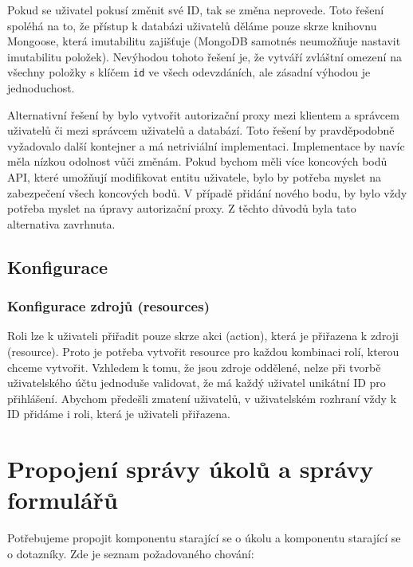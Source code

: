 Pokud se uživatel pokusí změnit své ID, tak se změna neprovede.
Toto řešení spoléhá na to, že přístup k databázi uživatelů děláme pouze skrze knihovnu Mongoose, která imutabilitu zajišťuje (MongoDB samotnés neumožňuje nastavit imutabilitu položek).
Nevýhodou tohoto řešení je, že vytváří zvláštní omezení na všechny položky s klíčem \texttt{id} ve všech odevzdáních, ale zásadní výhodou je jednoduchost.

Alternativní řešení by bylo vytvořit autorizační proxy mezi klientem a správcem uživatelů či mezi správcem uživatelů a databází.
Toto řešení by pravděpodobně vyžadovalo další kontejner a má netriviální implementaci.
Implementace by navíc měla nízkou odolnost vůči změnám.
Pokud bychom měli více koncových bodů API, které umožňují modifikovat entitu uživatele, bylo by potřeba myslet na zabezpečení všech koncových bodů.
V případě přidání nového bodu, by bylo vždy potřeba myslet na úpravy autorizační proxy.
Z těchto důvodů byla tato alternativa zavrhnuta.

\subsection{Konfigurace}\label{subsec:konfigurace}

\subsubsection{Konfigurace zdrojů (resources)}\label{subsubsec:konfigurace-resources}

Roli lze k uživateli přiřadit pouze skrze akci (action), která je přiřazena k zdroji (resource).
Proto je potřeba vytvořit resource pro každou kombinaci rolí, kterou chceme vytvořit.
Vzhledem k tomu, že jsou zdroje oddělené, nelze při tvorbě uživatelského účtu jednoduše validovat, že má každý uživatel unikátní ID pro přihlášení.
Abychom předešli zmatení uživatelů, v uživatelském rozhraní vždy k ID přidáme i roli, která je uživateli přiřazena.


\section{Propojení správy úkolů a správy formulářů}\label{sec:propojeni-spravy-ukolu-a-spravy-formularu}


Potřebujeme propojit komponentu starající se o úkolu a komponentu starající se o dotazníky.
Zde je seznam požadovaného chování:

